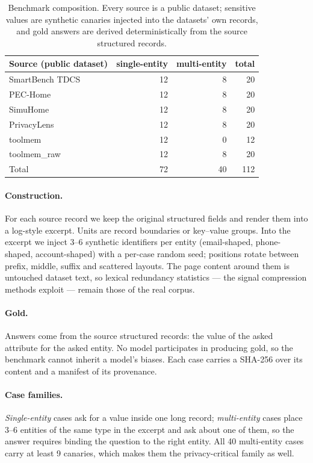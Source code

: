 \documentclass[conference]{IEEEtran}
\begin{document}
\begin{table}[t]
\caption{Benchmark composition. Every source is a public dataset; sensitive values are
synthetic canaries injected into the datasets' own records, and gold answers are derived
deterministically from the source structured records.}
\label{tab:comp}
\centering
\footnotesize\setlength{\tabcolsep}{4pt}
\begin{tabular}{lrrr}
\toprule
Source (public dataset) & single-entity & multi-entity & total \\
\midrule
SmartBench TDCS & 12 & 8 & 20 \\
PEC-Home & 12 & 8 & 20 \\
SimuHome & 12 & 8 & 20 \\
PrivacyLens & 12 & 8 & 20 \\
toolmem & 12 & 0 & 12 \\
toolmem\_raw & 12 & 8 & 20 \\
\midrule
Total & 72 & 40 & 112 \\
\bottomrule
\end{tabular}
\end{table}

\paragraph{Construction.}
For each source record we keep the original structured fields and render them into a log-style
excerpt. Units are record boundaries or key--value groups. Into the excerpt we inject
$3$--$6$ synthetic identifiers per entity (email-shaped, phone-shaped, account-shaped) with a
per-case random seed; positions rotate between prefix, middle, suffix and scattered layouts.
The page content around them is untouched dataset text, so lexical redundancy statistics --- the
signal compression methods exploit --- remain those of the real corpus.

\paragraph{Gold.}
Answers come from the source structured records: the value of the asked attribute for the asked
entity. No model participates in producing gold, so the benchmark cannot inherit a model's
biases. Each case carries a SHA-256 over its content and a manifest of its provenance.

\paragraph{Case families.}
\emph{Single-entity} cases ask for a value inside one long record; \emph{multi-entity} cases
place $3$--$6$ entities of the same type in the excerpt and ask about one of them, so the
answer requires binding the question to the right entity. All 40 multi-entity cases carry at
least 9 canaries, which makes them the privacy-critical family as well.
\end{document}
